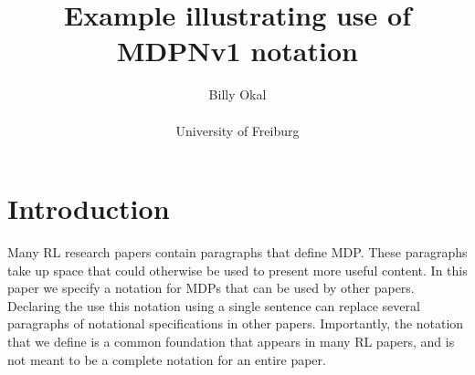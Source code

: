 \documentclass[a4paper]{article}
\author{Billy Okal\\\\
University of Freiburg}
\title{Example illustrating use of MDPNv1 notation}
\date{}
\begin{document}
\maketitle


\section{Introduction}
\label{sec:intro}
Many \gls{RL} research papers contain paragraphs that define \gls{MDP}.
These paragraphs take up space that could otherwise be used to present more useful content.
In this paper we specify a notation for MDPs that can be used by other papers. Declaring the use this notation using a single sentence can replace several paragraphs of notational specifications in other papers.
Importantly, the notation that we define is a common foundation that appears in many RL papers, and is not meant to be a complete notation for an entire paper.
\end{document}
